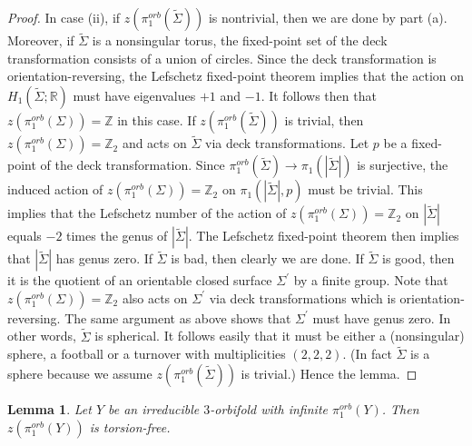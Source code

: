 \documentclass[11pt]{amsart}
\theoremstyle{plain}
\numberwithin{theorem}{section}
\newtheorem{lemma}[theorem]{Lemma}
\theoremstyle{definition}
\begin{document}
\begin{proof}
In case (ii), if $z(\pi_1^{orb}(\tilde{\Sigma}))$ is nontrivial, then we are done by part (a).
Moreover, if $\tilde{\Sigma}$ is a nonsingular torus, the fixed-point set of the deck transformation consists of a union of circles. Since the deck transformation is orientation-reversing, the Lefschetz fixed-point theorem implies that the action on $H_1(\tilde{\Sigma};{{\mathbb R}})$ must have eigenvalues $+1$ and $-1$. It follows then that $z(\pi_1^{orb}(\Sigma))={{\mathbb Z}}$ in this case. If 
$z(\pi_1^{orb}(\tilde{\Sigma}))$ is trivial, then $z(\pi_1^{orb}(\Sigma))={{\mathbb Z}}_2$ and acts on 
$\tilde{\Sigma}$ via deck transformations. Let $p$ be a fixed-point of the deck transformation. 
Since $\pi_1^{orb}(\tilde{\Sigma})\rightarrow \pi_1(|\tilde{\Sigma}|)$ 
is surjective, the induced action of $z(\pi_1^{orb}(\Sigma))={{\mathbb Z}}_2$ on $\pi_1(|\tilde{\Sigma}|,p)$ must be trivial. This implies that the Lefschetz number of the action of $z(\pi_1^{orb}(\Sigma))={{\mathbb Z}}_2$ on 
$|\tilde{\Sigma}|$ equals $-2$ times the genus of $|\tilde{\Sigma}|$. The Lefschetz fixed-point 
theorem then implies that $|\tilde{\Sigma}|$ has genus zero. If $\tilde{\Sigma}$ is bad, then clearly 
we are done. If $\tilde{\Sigma}$ is good, then it is the quotient of an orientable closed surface 
$\Sigma^\prime$ by a finite group. Note that $z(\pi_1^{orb}(\Sigma))={{\mathbb Z}}_2$ also acts on 
$\Sigma^\prime$ via deck transformations which is orientation-reversing. The same argument as above shows that $\Sigma^\prime$ must have genus zero. In other words, $\tilde{\Sigma}$ is spherical. It follows easily that it must be either a (nonsingular) sphere, a football or a turnover with multiplicities $(2,2,2)$. (In fact $\tilde{\Sigma}$ is a sphere because we assume $z(\pi_1^{orb}(\tilde{\Sigma}))$ is trivial.) Hence the lemma.

\end{proof}

\begin{lemma}
Let $Y$ be an irreducible $3$-orbifold with infinite $\pi_1^{orb}(Y)$. Then $z(\pi_1^{orb}(Y))$
is torsion-free.
\end{lemma}
\end{document}
